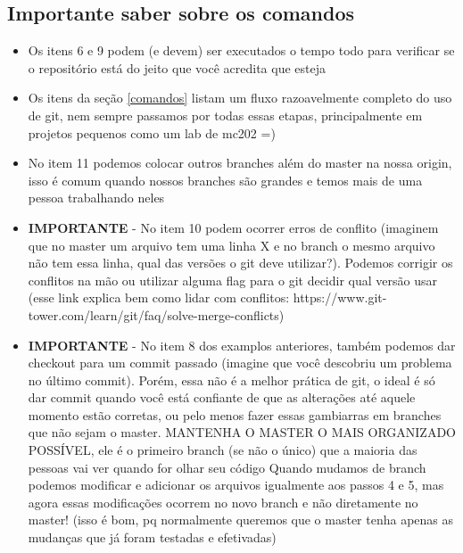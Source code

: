 \documentclass[12pt]{article}
\begin{document}
\begin{doublespacing}
\subsection{Importante saber sobre os comandos}
\begin{itemize}

\item{Os itens 6 e 9 podem (e devem) ser executados o tempo todo para verificar se o repositório está do jeito que você acredita que esteja
}
\item{Os itens da seção \ref{comandos} listam um fluxo razoavelmente completo do uso de git, nem sempre passamos por todas essas etapas, principalmente em projetos pequenos como um lab de mc202 =)
}

\item{No item 11 podemos colocar outros branches além do master na nossa origin, isso é comum quando nossos branches são grandes e temos mais de uma pessoa trabalhando neles
}

\item{\textbf{IMPORTANTE} - No item 10 podem ocorrer erros de conflito (imaginem que no master um arquivo tem uma linha X e no branch o mesmo arquivo não tem essa linha, qual das versões o git deve utilizar?). Podemos corrigir os conflitos na mão ou utilizar alguma flag para o git decidir qual versão usar (esse link explica bem como lidar com conflitos: https://www.git-tower.com/learn/git/faq/solve-merge-conflicts)
}

\item \textbf{IMPORTANTE} - No item 8 dos examplos anteriores, também podemos dar checkout para um commit passado (imagine que você descobriu um problema no último commit). Porém, essa não é a melhor prática de git, o ideal é só dar commit quando você está confiante de que as alterações até aquele momento estão corretas, ou pelo menos fazer essas gambiarras em branches que não sejam o master. MANTENHA O MASTER O MAIS ORGANIZADO POSSÍVEL, ele é o primeiro branch (se não o único) que a maioria das pessoas vai ver quando for olhar seu código
\newline
Quando mudamos de branch podemos modificar e adicionar os arquivos igualmente aos passos 4 e 5, mas agora essas modificações ocorrem no novo branch e não diretamente no master! (isso é bom, pq normalmente queremos que o master tenha apenas as mudanças que já foram testadas e efetivadas)

\label{checkout_c}
\end{itemize}


\end{doublespacing}
\end{document}

